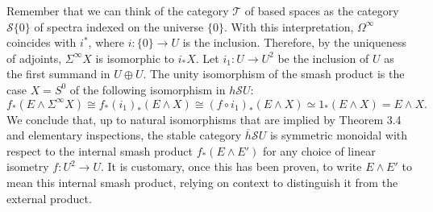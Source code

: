 Remember that we can think of the category $\mathscr{T}$ of based spaces as the category $\mathscr{S}\{0\}$ of spectra indexed on the universe $\{0\}$. With this interpretation, $\Omega^\infty$ coincides with $i^*$, where $i: \{0\} \longrightarrow U$ is the inclusion. Therefore, by the uniqueness of adjoints, $\Sigma^\infty X$ is isomorphic to $i_* X$. Let $i_1: U \longrightarrow U^2$ be the inclusion of $U$ as the first summand in $U \oplus U$. The unity isomorphism of the smash product is the case $X = S^0$ of the following isomorphism in $h\mathscr{S}U$:
\begin{equation}
    f_*(E \wedge \Sigma^\infty X) \cong f_*(i_1)_*(E \wedge X) \cong (f \circ i_1)_*(E \wedge X) \simeq 1_*(E \wedge X) = E \wedge X.
\end{equation}
We conclude that, up to natural isomorphisms that are implied by Theorem 3.4 and elementary inspections, the stable category $\overline{h}\mathscr{S}U$ is symmetric monoidal with respect to the internal smash product $f_*(E \wedge E')$ for any choice of linear isometry $f: U^2 \longrightarrow U$. It is customary, once this has been proven, to write $E \wedge E'$ to mean this internal smash product, relying on context to distinguish it from the external product.


